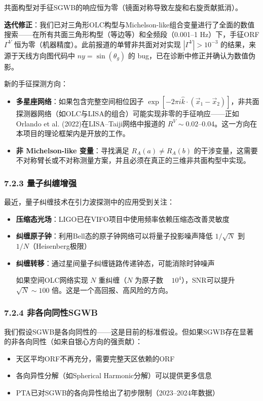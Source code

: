\documentclass[12pt,a4paper]{article}
\begin{document}
共面构型对手征SGWB的响应恒为零（镜面对称导致左旋和右旋贡献抵消）。

\textbf{迭代修正}：我们已对三角形OLC构型与Michelson-like组合变量进行了全面的数值搜索——在所有共面三角形构型（等边等）和全频段（0.001–1 Hz）下，手征ORF $\Gamma^V$ 恒为零（机器精度）。此前报道的单臂非共面对对实现 $|\Gamma^V| > 10^{-3}$ 的结果，来源于天线方向图代码中 $ny = \sin(\theta_g)$ 的 bug，已在诊断中修正并确认为数值伪影。

新的手征探测方向：
\begin{itemize}
  \item \textbf{多星座网络}：如果包含完整空间相位因子 $\exp[-2\pi i \hat{k}\cdot(\vec{x}_1 - \vec{x}_2)]$，非共面探测器网络（如OLC与LISA的组合）可能实现非零的手征响应——正如Orlando et al. (2022)在LISA–Taiji网络中报道的 $R^V \sim 0.02$–0.04。这一方向在本项目的理论框架内是开放的工作。
  \item \textbf{非 Michelson-like 变量}：寻找满足 $R_A(a) \neq R_A(b)$ 的干涉变量，这需要不对称臂长或不对称测量方案，并且必须在真正的三维非共面构型中实现。

\end{itemize}
\subsubsection{7.2.3 量子纠缠增强}


最近，量子纠缠技术在引力波探测中的应用受到关注：
\begin{itemize}
  \item \textbf{压缩态光场}：LIGO已在VIFO项目中使用频率依赖压缩态改善灵敏度
  \item \textbf{纠缠原子钟}：利用Bell态的原子钟网络可以将量子投影噪声降低 $1/\sqrt{N}$ 到 $1/N$（Heisenberg极限）
  \item \textbf{纠缠转移}：通过星间量子纠缠链路传递钟态，可能消除时钟噪声

如果空间OLC网络实现 $N$ 重纠缠（$N$ 为原子数 ~ $10^4$），SNR可以提升 $\sqrt{N} \sim 100$ 倍。这是一个高回报、高风险的方向。

\end{itemize}
\subsubsection{7.2.4 非各向同性SGWB}


我们假设SGWB是各向同性的——这是目前的标准假设。但如果SGWB存在显著的非各向同性（如来自银心方向的强贡献）：

\begin{itemize}
  \item 天区平均ORF不再充分，需要完整天区依赖的ORF
  \item 各向异性分解（如Spherical Harmonic分解）可以提供更多信息
  \item PTA已对SGWB的各向异性给出了初步限制（2023–2024年数据）

\end{itemize}
\end{document}
